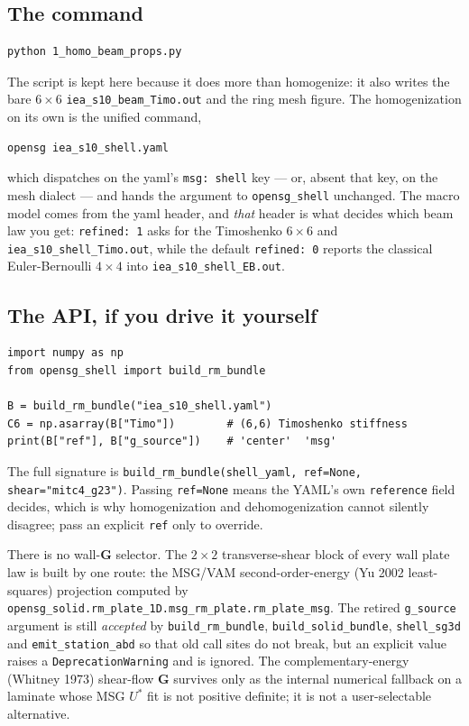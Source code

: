\subsection*{The command}

\begin{lstlisting}[style=shellst]
python 1_homo_beam_props.py
\end{lstlisting}

The script is kept here because it does more than homogenize: it also writes
the bare $6\times6$ \texttt{iea\_s10\_beam\_Timo.out} and the ring mesh figure.
The homogenization on its own is the unified command,

\begin{lstlisting}[style=shellst]
opensg iea_s10_shell.yaml
\end{lstlisting}

which dispatches on the yaml's \texttt{msg: shell} key --- or, absent that key,
on the mesh dialect --- and hands the argument to \texttt{opensg\_shell}
unchanged. The macro model comes from the yaml header, and \emph{that} header
is what decides which beam law you get: \texttt{refined: 1} asks for the
Timoshenko $6\times6$ and \texttt{iea\_s10\_shell\_Timo.out}, while the default
\texttt{refined: 0} reports the classical Euler-Bernoulli $4\times4$ into
\texttt{iea\_s10\_shell\_EB.out}.

\subsection*{The API, if you drive it yourself}

\begin{lstlisting}[style=opensg,caption={The whole homogenization is one call.}]
import numpy as np
from opensg_shell import build_rm_bundle

B = build_rm_bundle("iea_s10_shell.yaml")
C6 = np.asarray(B["Timo"])        # (6,6) Timoshenko stiffness
print(B["ref"], B["g_source"])    # 'center'  'msg'
\end{lstlisting}

The full signature is
\texttt{build\_rm\_bundle(shell\_yaml, ref=None, shear="mitc4\_g23")}. Passing
\texttt{ref=None} means the YAML's own \texttt{reference} field decides, which
is why homogenization and dehomogenization cannot silently disagree; pass an
explicit \texttt{ref} only to override.

There is no wall-$\mathbf{G}$ selector. The $2\times2$ transverse-shear block
of every wall plate law is built by one route: the MSG/VAM
second-order-energy (Yu 2002 least-squares) projection computed by
\texttt{opensg\_solid.rm\_plate\_1D.msg\_rm\_plate.rm\_plate\_msg}. The
retired \texttt{g\_source} argument is still \emph{accepted} by
\texttt{build\_rm\_bundle}, \texttt{build\_solid\_bundle},
\texttt{shell\_sg3d} and \texttt{emit\_station\_abd} so that old call sites do
not break, but an explicit value raises a \texttt{DeprecationWarning} and is
ignored. The complementary-energy (Whitney 1973) shear-flow $\mathbf{G}$
survives only as the internal numerical fallback on a laminate whose MSG
$U^*$ fit is not positive definite; it is not a user-selectable alternative.

